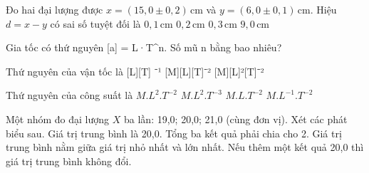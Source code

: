 \begin{ex}
Đo hai đại lượng được $x=(15,0\pm0,2)\,\mathrm{cm}$ và $y=(6,0\pm0,1)\,\mathrm{cm}$. Hiệu $d=x-y$ có sai số tuyệt đối là
\choice
{$0,1\,\mathrm{cm}$}
{$0,2\,\mathrm{cm}$}
{\True $0,3\,\mathrm{cm}$}
{$9,0\,\mathrm{cm}$}
\end{ex}


\begin{ex}
Gia tốc có thứ nguyên [a] = L·T^n. Số mũ n bằng bao nhiêu?
\end{ex}

\begin{ex}
Thứ nguyên của vận tốc là
\choice
{[L][T]}
{\True [L][T]⁻¹}
{[M][L][T]⁻²}
{[M][L]²[T]⁻²}
\end{ex}

\begin{ex}
Thứ nguyên của công suất là
\choice
{$M.L^2.T^{-2}$}
{\True $M.L^2.T^{-3}$}
{$M.L.T^{-2}$}
{$M.L^{-1}.T^{-2}$}
\end{ex}

\begin{ex}
Một nhóm đo đại lượng $X$ ba lần: 19,0; 20,0; 21,0 (cùng đơn vị). Xét các phát biểu sau.
\choiceTF
{\True Giá trị trung bình là 20,0.}
{Tổng ba kết quả phải chia cho 2.}
{\True Giá trị trung bình nằm giữa giá trị nhỏ nhất và lớn nhất.}
{\True Nếu thêm một kết quả 20,0 thì giá trị trung bình không đổi.}
\end{ex}


